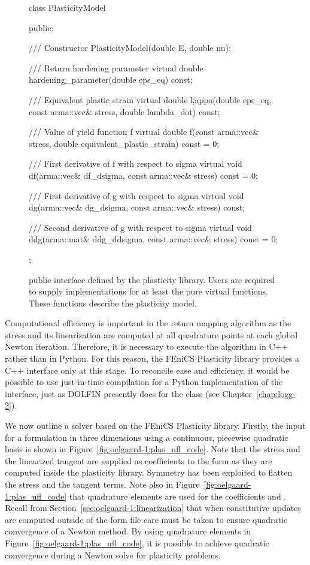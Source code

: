 \begin{figure}
\begin{c++}
class PlasticityModel
{
public:

  /// Constructor
  PlasticityModel(double E, double nu);

  /// Return hardening parameter
  virtual double hardening_parameter(double eps_eq) const;

  /// Equivalent plastic strain
  virtual double kappa(double eps_eq, const arma::vec& stress,
                       double lambda_dot) const;

  /// Value of yield function f
  virtual double f(const arma::vec& stress,
                   double equivalent_plastic_strain) const = 0;

  /// First derivative of f with respect to sigma
  virtual void df(arma::vec& df_dsigma,
                  const arma::vec& stress) const = 0;

  /// First derivative of g with respect to sigma
  virtual void dg(arma::vec& dg_dsigma,
                  const arma::vec& stress) const;

  /// Second derivative of g with respect to sigma
  virtual void ddg(arma::mat& ddg_ddsigma,
                   const arma::vec& stress) const = 0;

};
\end{c++}
\caption{ public interface defined by the plasticity
library. Users are required to supply implementations for at least the
pure virtual functions. These functions describe the plasticity model.}
\label{fig:oelgaard-1:plasticity_interface}
\end{figure}

Computational efficiency is important in the return mapping algorithm
as the stress and its linearization are computed at all quadrature
points at each global Newton iteration. Therefore, it is necessary to
execute the algorithm in C++ rather than in Python. For this reason, the
FEniCS Plasticity library provides a C++ interface only at this stage.
To reconcile ease and efficiency, it would be possible to use just-in-time
compilation for a Python implementation of the 
interface, just as DOLFIN presently does for the  class
(see Chapter~\ref{chap:logg-2}).

We now outline a solver based on the FEniCS Plasticity library.
Firstly, the \ufl{} input for a formulation in three dimensions
using a continuous, piecewise quadratic basis is shown in
Figure~\ref{fig:oelgaard-1:plas_ufl_code}. Note that the stress
and the linearized tangent are supplied as coefficients to the
form as they are computed inside the plasticity library.  Symmetry
has been exploited to flatten the stress and the tangent terms.
Note also in Figure~\ref{fig:oelgaard-1:plas_ufl_code} that quadrature
elements are used for the coefficients  and .  Recall from
Section~\ref{sec:oelgaard-1:linearization} that when constitutive updates
are computed outside of the form file care must be taken to ensure
quadratic convergence of a Newton method.  By using quadrature elements
in Figure~\ref{fig:oelgaard-1:plas_ufl_code}, it is possible to achieve
quadratic convergence during a Newton solve for plasticity problems.

